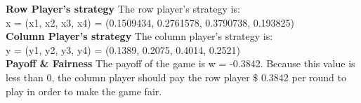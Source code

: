 \documentclass[11pt, solution, letterpaper]{format}
\begin{document}
\textbf{Row Player's strategy}
The row player's strategy is:\\
x = (x1, x2, x3, x4) = (0.1509434, 0.2761578, 0.3790738, 0.193825)\\

\textbf{Column Player's strategy}
The column player's strategy is:\\
y = (y1, y2, y3, y4) = (0.1389, 0.2075, 0.4014, 0.2521)\\

\textbf{Payoff & Fairness}
The payoff of the game is w = -0.3842. Because this value is less than 0, the column player should pay the row player $\$$ 0.3842 per round to play in order to make the game fair.
\end{document}
